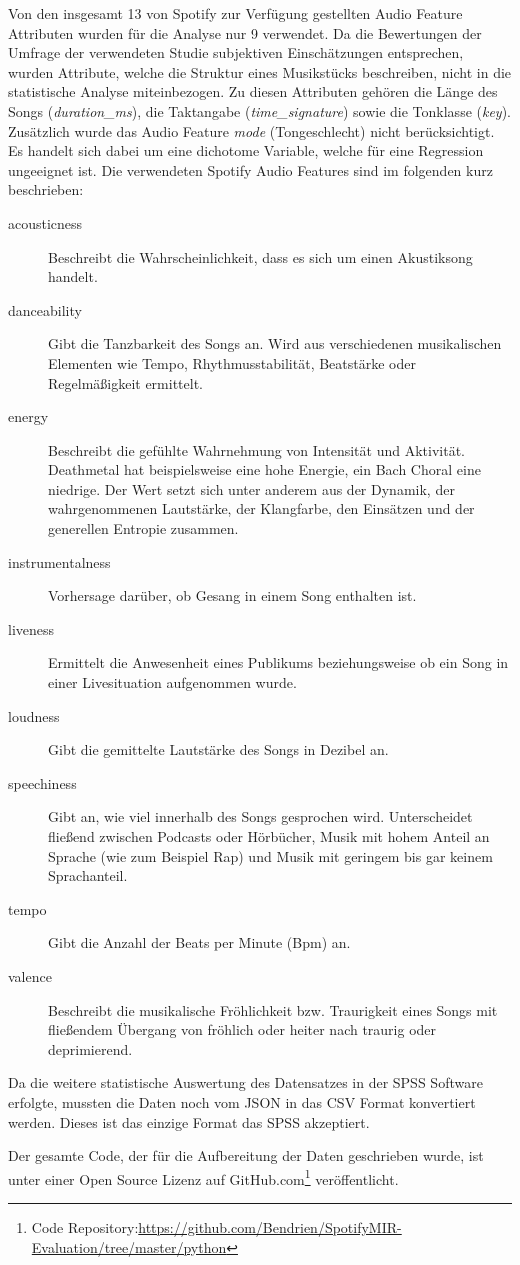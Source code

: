 Von den insgesamt 13 von Spotify zur Verfügung gestellten Audio Feature Attributen wurden für die Analyse nur 9 verwendet.
Da die Bewertungen der Umfrage der verwendeten Studie subjektiven Einschätzungen entsprechen, wurden Attribute, welche die Struktur eines Musikstücks beschreiben, nicht in die statistische Analyse miteinbezogen.
Zu diesen Attributen gehören die Länge des Songs (\textit{duration\_ms}), die Taktangabe (\textit{time\_signature}) sowie die Tonklasse (\textit{key}).
Zusätzlich wurde das Audio Feature \textit{mode} (Tongeschlecht) nicht berücksichtigt. Es handelt sich dabei um eine dichotome Variable, welche für eine Regression ungeeignet ist.
Die verwendeten Spotify Audio Features sind im folgenden kurz beschrieben:

\begin{description}
    \item[acousticness]
        Beschreibt die Wahrscheinlichkeit, dass  es sich um einen Akustiksong handelt.
    \item[danceability]
        Gibt die Tanzbarkeit des Songs an.
        Wird aus verschiedenen musikalischen Elementen wie Tempo, Rhythmusstabilität, Beatstärke oder Regelmäßigkeit ermittelt.
    \item[energy]
        Beschreibt die gefühlte Wahrnehmung von Intensität und Aktivität.
        Deathmetal hat beispielsweise eine hohe Energie, ein Bach Choral eine niedrige. Der Wert setzt sich unter anderem aus der Dynamik, der wahrgenommenen Lautstärke, der Klangfarbe, den Einsätzen und der generellen Entropie zusammen.
    \item[instrumentalness]
        Vorhersage darüber, ob Gesang in einem Song enthalten ist.
    \item[liveness]
        Ermittelt die Anwesenheit eines Publikums beziehungsweise ob ein Song in einer Livesituation aufgenommen wurde.
    \item[loudness]
        Gibt die gemittelte Lautstärke des Songs in Dezibel an.
    \item[speechiness]
        Gibt an, wie viel innerhalb des Songs gesprochen wird.
        Unterscheidet fließend zwischen Podcasts oder Hörbücher, Musik mit hohem Anteil an Sprache (wie zum Beispiel Rap) und Musik mit geringem bis gar keinem Sprachanteil.
    \item[tempo]
        Gibt die Anzahl der Beats per Minute (Bpm) an.
    \item[valence]
        Beschreibt die musikalische Fröhlichkeit bzw. Traurigkeit eines Songs mit fließendem Übergang von fröhlich oder heiter 			nach traurig oder deprimierend.
\end{description}

Da die weitere statistische Auswertung des Datensatzes in der SPSS Software erfolgte, mussten die Daten noch vom JSON in das CSV Format konvertiert werden. Dieses ist das einzige Format das SPSS akzeptiert.

Der gesamte Code, der für die Aufbereitung der Daten geschrieben wurde, ist unter einer Open Source Lizenz auf GitHub.com\footnote{Code Repository:\hfill \url{https://github.com/Bendrien/SpotifyMIR-Evaluation/tree/master/python}} veröffentlicht.

